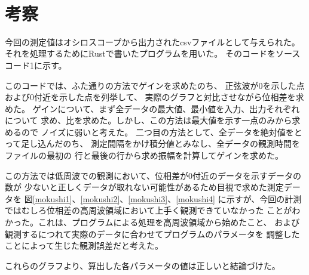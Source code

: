 \documentclass[uplatex, 11pt,a4j, titlepage]{jsarticle}
\begin{document}
\newpage
\ 
\newpage
\ 
\newpage
\section{考察}

今回の測定値はオシロスコープから出力されたcsvファイルとして与えられた。
それを処理するためにRustで書いたプログラムを用いた。
そのコードをソースコード1に示す。

このコードでは、ふた通りの方法でゲインを求めたのち、
正弦波が0を示した点および0付近を示した点を列挙して、
実際のグラフと対比させながら位相差を求めた。
ゲインについて、まず全データの最大値、最小値を入力、出力それぞれについて
求め、比を求めた。しかし、この方法は最大値を示す一点のみから求めるので
ノイズに弱いと考えた。
二つ目の方法として、全データを絶対値をとって足し込んだのち、
測定間隔をかけ積分値とみなし、全データの観測時間をファイルの最初の
行と最後の行から求め振幅を計算してゲインを求めた。

この方法では低周波での観測において、位相差が0付近のデータを示すデータの数が
少ないと正しくデータが取れない可能性があるため目視で求めた測定データを
図\ref{mokushi1}、\ref{mokushi2}、\ref{mokushi3}、\ref{mokushi4}
に示すが、今回の計測ではむしろ位相差の高周波領域において上手く観測できていなかった
ことがわかった。これは、プログラムによる処理を高周波領域から始めたこと、
および観測するにつれて実際のデータに合わせてプログラムのパラメータを
調整したことによって生じた観測誤差だと考えた。

これらのグラフより、算出した各パラメータの値は正しいと結論づけた。
\end{document}

